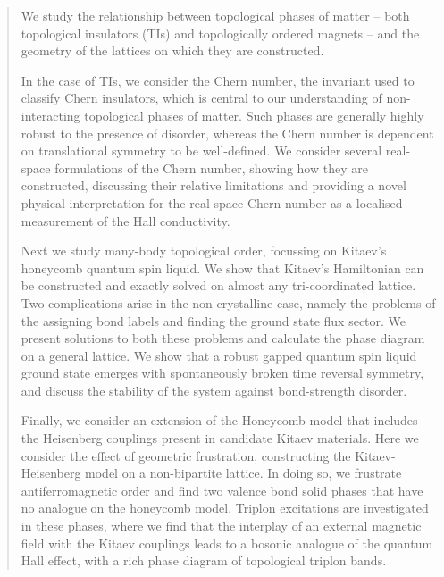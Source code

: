 \begin{abstract}

We study the relationship between topological phases of matter -- both topological insulators (TIs) and topologically ordered magnets -- and the geometry of the lattices on which they are constructed.

In the case of TIs, we consider the Chern number, the invariant used to classify Chern insulators, which is central to our understanding of non-interacting topological phases of matter. Such phases are generally highly robust to the presence of disorder, whereas the Chern number is dependent on translational symmetry to be well-defined. We consider several real-space formulations of the Chern number, showing how they are constructed, discussing their relative limitations and providing a novel physical interpretation for the real-space Chern number as a localised measurement of the Hall conductivity.

Next we study many-body topological order, focussing on Kitaev's honeycomb quantum spin liquid. We show that Kitaev's Hamiltonian can be constructed and exactly solved on almost any tri-coordinated lattice. Two complications arise in the non-crystalline case, namely the problems of the assigning bond labels and finding the ground state flux sector. We present solutions to both these problems and calculate the phase diagram on a general lattice. We show that a robust gapped quantum spin liquid ground state emerges with spontaneously broken time reversal symmetry, and discuss the stability of the system against bond-strength disorder.

Finally, we consider an extension of the Honeycomb model that includes the Heisenberg couplings present in candidate Kitaev materials. Here we consider the effect of geometric frustration, constructing the Kitaev-Heisenberg model on a non-bipartite lattice. In doing so, we frustrate antiferromagnetic order and find two valence bond solid phases that have no analogue on the honeycomb model. Triplon excitations are investigated in these phases, where we find that the interplay of an external magnetic field with the Kitaev couplings leads to a bosonic analogue of the quantum Hall effect, with a rich phase diagram of topological triplon bands. 

\end{abstract}